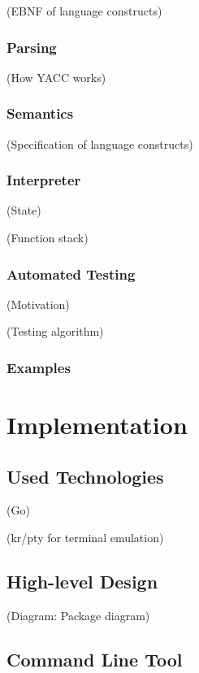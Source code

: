 \documentclass[twoside]{scrreprt}
\begin{document}
                (EBNF of language constructs)

\subsection{Parsing}

                (How YACC works)

\subsection{Semantics}

                (Specification of language constructs)

\subsection{Interpreter}

                (State)

                (Function stack)

\subsection{Automated Testing}

                (Motivation)

                (Testing algorithm)

\subsection{Examples}

\chapter{Implementation}

\section{Used Technologies}

            (Go)

            (kr/pty for terminal emulation)

\section{High-level Design}

            (Diagram: Package diagram)

\section{Command Line Tool}
\end{document}
